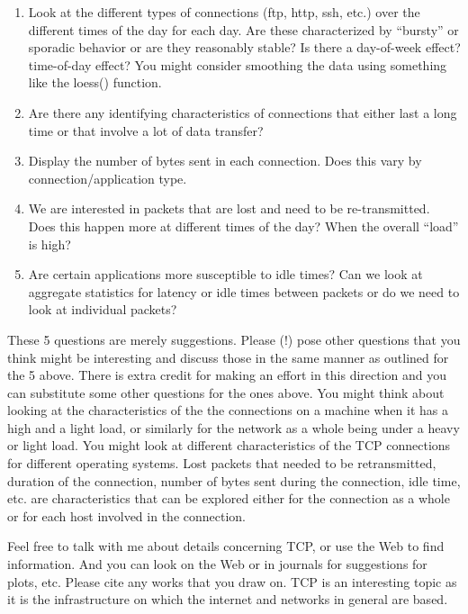 \documentclass[11pt]{article}
\begin{document}
\begin{enumerate}

\item Look at the different types of connections (ftp, http, ssh,
  etc.)  over the different times of the day for each day.
  Are these characterized by ``bursty'' or sporadic behavior
  or are they reasonably stable?
  Is there a day-of-week effect? time-of-day effect?
  You might consider smoothing the data using something
  like the loess() function.

\item Are there any identifying characteristics of connections that 
  either last a long time or that involve a lot of data transfer?

\item Display the number of bytes sent in each connection.
    Does this vary by connection/application type.

 \item We are interested in packets that are lost and need to be
    re-transmitted.  Does this happen more at different times of the
    day?  When the overall ``load'' is high?

 \item Are certain applications more susceptible to idle times?
   Can we look at aggregate statistics for latency or idle times
   between packets or do we need to look at individual packets?
\end{enumerate}

These 5 questions are merely suggestions. Please (!) pose other
questions that you think might be interesting and discuss those in the
same manner as outlined for the 5 above.  There is extra credit for
making an effort in this direction and you can substitute some other
questions for the ones above.  You might think about looking at the
characteristics of the the connections on a machine when it has a high
and a light load, or similarly for the network as a whole being under
a heavy or light load.  You might look at different characteristics of
the TCP connections for different operating systems.  Lost packets
that needed to be retransmitted, duration of the connection, number of
bytes sent during the connection, idle time, etc. are characteristics
that can be explored either for the connection as a whole or for each
host involved in the connection.

Feel free to talk with me about details concerning TCP, or use the Web
to find information.  And you can look on the Web or in journals for
suggestions for plots, etc.  Please cite any works that you draw on.
TCP is an interesting topic as it is the infrastructure on which the
internet and networks in general are based.
\end{document}
